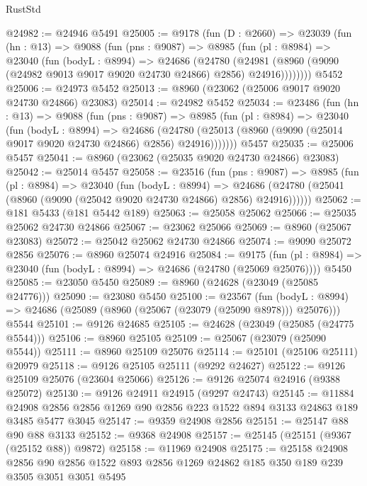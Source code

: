 \begin{lexlean}{RustStd}
\begin{coremodule}
@24982 := @24946 @5491
@25005 := @9178
    (fun (D : @2660) =>
    @23039
      (fun (hn : @13) =>
      @9088
        (fun (pns : @9087) =>
        @8985
          (fun (pl : @8984) =>
          @23040
            (fun (bodyL : @8994) =>
            @24686
              (@24780
                (@24981 (@8960 (@9090 (@24982 @9013 @9017 @9020 @24730 @24866) @2856) @24916))))))))
    @5452
@25006 := @24973 @5452
@25013 := @8960 (@23062 (@25006 @9017 @9020 @24730 @24866) @23083)
@25014 := @24982 @5452
@25034 := @23486
    (fun (hn : @13) =>
    @9088
      (fun (pns : @9087) =>
      @8985
        (fun (pl : @8984) =>
        @23040
          (fun (bodyL : @8994) =>
          @24686
            (@24780 (@25013 (@8960 (@9090 (@25014 @9017 @9020 @24730 @24866) @2856) @24916)))))))
    @5457
@25035 := @25006 @5457
@25041 := @8960 (@23062 (@25035 @9020 @24730 @24866) @23083)
@25042 := @25014 @5457
@25058 := @23516
    (fun (pns : @9087) =>
    @8985
      (fun (pl : @8984) =>
      @23040
        (fun (bodyL : @8994) =>
        @24686 (@24780 (@25041 (@8960 (@9090 (@25042 @9020 @24730 @24866) @2856) @24916))))))
@25062 := @181 @5433 (@181 @5442 @189)
@25063 := @25058 @25062
@25066 := @25035 @25062 @24730 @24866
@25067 := @23062 @25066
@25069 := @8960 (@25067 @23083)
@25072 := @25042 @25062 @24730 @24866
@25074 := @9090 @25072 @2856
@25076 := @8960 @25074 @24916
@25084 := @9175
    (fun (pl : @8984) => @23040 (fun (bodyL : @8994) => @24686 (@24780 (@25069 @25076))))
    @5450
@25085 := @23050 @5450
@25089 := @8960 (@24628 (@23049 (@25085 @24776)))
@25090 := @23080 @5450
@25100 := @23567
    (fun (bodyL : @8994) => @24686 (@25089 (@8960 (@25067 (@23079 (@25090 @8978))) @25076)))
    @5544
@25101 := @9126 @24685
@25105 := @24628 (@23049 (@25085 (@24775 @5544)))
@25106 := @8960 @25105
@25109 := @25067 (@23079 (@25090 @5544))
@25111 := @8960 @25109 @25076
@25114 := @25101 (@25106 @25111) @20979
@25118 := @9126 @25105 @25111 (@9292 @24627)
@25122 := @9126 @25109 @25076 (@23604 @25066)
@25126 := @9126 @25074 @24916 (@9388 @25072)
@25130 := @9126 @24911 @24915 (@9297 @24743)
@25145 := @11884
    @24908
    @2856
    @2856
    @1269
    @90
    @2856
    @223
    @1522
    @894
    @3133
    @24863
    @189
    @3485
    @5477
    @3045
@25147 := @9359 @24908 @2856
@25151 := @25147 @88 @90 @88 @3133
@25152 := @9368 @24908
@25157 := @25145 (@25151 (@9367 (@25152 @88)) @9872)
@25158 := @11969 @24908
@25175 := @25158
    @24908
    @2856
    @90
    @2856
    @1522
    @893
    @2856
    @1269
    @24862
    @185
    @350
    @189
    @239
    @3505
    @3051
    @3051
    @5495

\end{coremodule}
\end{lexlean}
